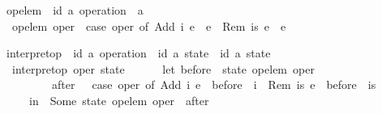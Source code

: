 \begin{isabellebody}
\isamarkupfalse%
\ op{\isacharunderscore}elem\ {\isacharcolon}{\isacharcolon}\ {\isachardoublequoteopen}{\isacharparenleft}{\isacharprime}id{\isacharcomma}\ {\isacharprime}a{\isacharparenright}\ operation\ {\isasymRightarrow}\ {\isacharprime}a{\isachardoublequoteclose}\ \isanewline
\ \ {\isachardoublequoteopen}op{\isacharunderscore}elem\ oper\ {\isasymequiv}\ case\ oper\ of\ Add\ i\ e\ {\isasymRightarrow}\ e\ {\isacharbar}\ Rem\ is\ e\ {\isasymRightarrow}\ e{\isachardoublequoteclose}\isanewline
\end{isabellebody}

\begin{isabellebody}
\isamarkupfalse%
\ interpret{\isacharunderscore}op\ {\isacharcolon}{\isacharcolon}\ {\isachardoublequoteopen}{\isacharparenleft}{\isacharprime}id{\isacharcomma}\ {\isacharprime}a{\isacharparenright}\ operation\ {\isasymRightarrow}\ {\isacharparenleft}{\isacharprime}id{\isacharcomma}\ {\isacharprime}a{\isacharparenright}\ state\ {\isasymrightharpoonup}\ {\isacharparenleft}{\isacharprime}id{\isacharcomma}\ {\isacharprime}a{\isacharparenright}\ state{\isachardoublequoteclose}\ {\isacharparenleft}{\isachardoublequoteopen}{\isasymlangle}{\isacharunderscore}{\isasymrangle}{\isachardoublequoteclose}\ {\isacharbrackleft}{}{\isacharbrackright}\ {}{}{}{}{\isacharparenright}\ \isanewline
\ \ {\isachardoublequoteopen}interpret{\isacharunderscore}op\ oper\ state\ {\isasymequiv}\isanewline
\ \ \ \ \ let\ before\ {\isacharequal}\ state\ {\isacharparenleft}op{\isacharunderscore}elem\ oper{\isacharparenright}{\isacharsemicolon}\isanewline
\ \ \ \ \ \ \ \ \ after\ \ {\isacharequal}\ case\ oper\ of\ Add\ i\ e\ {\isasymRightarrow}\ before\ {\isasymunion}\ {\isacharbraceleft}i{\isacharbraceright}\ {\isacharbar}\ Rem\ is\ e\ {\isasymRightarrow}\ before\ {\isacharminus}\ is\isanewline
\ \ \ \ \ in\ \ Some\ {\isacharparenleft}state\ {\isacharparenleft}{\isacharparenleft}op{\isacharunderscore}elem\ oper{\isacharparenright}\ {\isacharcolon}{\isacharequal}\ after{\isacharparenright}{\isacharparenright}{\isachardoublequoteclose}\isanewline
\end{isabellebody}

